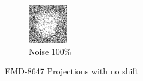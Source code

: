 \documentclass[twoside]{iitbreport}
\begin{document}
\begin{figure}[h]
\begin{subfigure}{.28\textwidth}
\includegraphics[width=0.8\linewidth]{Emd_8647_proj1_noise_100.jpg}
\captionsetup{justification=centering}
\caption{ Noise 100\%}
\end{subfigure}
\caption{EMD-8647 Projections with no shift}
\label{fig:EMD-8647 Projections: Noisy}
\end{figure}
\end{document}
